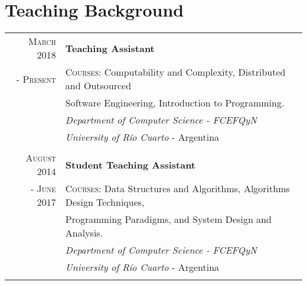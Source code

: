 \documentclass[a4paper,10pt]{article} %
\begin{document}
\section{Teaching Background}
\begin{longtable}{rl}

\textsc{March 2018} & \textbf{Teaching Assistant} \\
\textsc{- Present} & \textsc{Courses:} Computability and Complexity, Distributed and Outsourced \\
& Software Engineering, Introduction to Programming. \\
& \textit{Department of Computer Science - FCEFQyN} \\
& \textit{University of Río Cuarto} - Argentina \\ & \\

\textsc{August 2014} & \textbf{Student Teaching Assistant} \\
\textsc{- June 2017} & \textsc{Courses:} Data Structures and Algorithms, Algorithms Design Techniques, \\
& Programming Paradigms, and System Design and Analysis. \\
& \textit{Department of Computer Science - FCEFQyN} \\
& \textit{University of Río Cuarto} - Argentina \\ & \\

\end{longtable}
\end{document}
